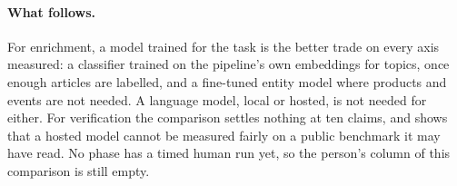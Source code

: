 \paragraph{What follows.} For enrichment, a model trained for the task
is the better trade on every axis measured: a classifier trained on the
pipeline's own embeddings for topics, once enough articles are labelled,
and a fine-tuned entity model where products and events are not needed.
A language model, local or hosted, is not needed for either. For
verification the comparison settles nothing at ten claims, and shows
that a hosted model cannot be measured fairly on a public benchmark it
may have read. No phase has a timed human run yet, so the person's
column of this comparison is still empty.
